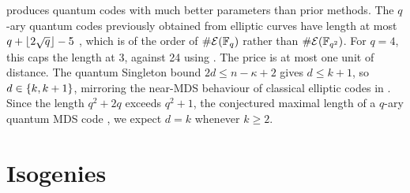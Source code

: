 \documentclass[twocolumn, 11pt]{scrartcl}
\begin{document}
{ produces quantum codes with much better parameters than prior methods. The $q$-ary quantum codes previously obtained from elliptic curves \cite{jin2012euclidean} have length at most $q+\lfloor2\sqrt q\rfloor-5$ \cite[Rem.~3]{sok2021new}, which is of the order of $\#\mathcal{E}(\mathbb{F}_q)$ rather than $\#\mathcal{E}(\mathbb{F}_{q^2})$. For $q=4$, this caps the length at 3, against 24 using . The price is at most one unit of distance. The quantum Singleton bound $2d\leq n-\kappa+2$ gives $d\leq k+1$, so $d\in\{k,k+1\}$, mirroring the near-MDS behaviour of classical elliptic codes in . Since the length $q^2+2q$ exceeds $q^2+1$, the conjectured maximal length of a $q$-ary quantum MDS code \cite{sok2021new}, we expect $d=k$ whenever $k\geq2$.

} %

\section{Isogenies} \label{section:isogenies}
\end{document}
